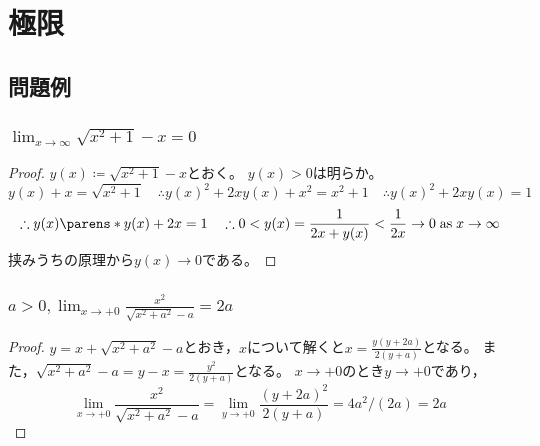 \chapter{極限}
    \section{問題例}
        \subsection{\texorpdfstring{$\lim_{x\to\infty} \sqrt{x^2+1} - x = 0$}{√(x\string^2+1)-x → 0 as x→∞}}
            \begin{proof}
                $y(x) \coloneq \sqrt{x^2+1} - x$とおく。
                $y(x) > 0$は明らか。
                \[ y(x)+x = \sqrt{x^2+1} \quad \therefore y(x)^2 + 2xy(x) + x^2 = x^2 + 1 \quad \therefore y(x)^2 + 2xy(x) = 1 \]
                \[ \therefore y(x)\parens*{y(x) + 2x} = 1 \quad \therefore 0 < y(x) = \frac{1}{2x + y(x)} < \frac{1}{2x} \to 0\;\text{as}\;x\to\infty \]
                挟みうちの原理から$y(x) \to 0$である。
            \end{proof}
        \subsection{\texorpdfstring{$a>0,\lim_{x\to+0}\frac{x^2}{\sqrt{x^2+a^2}-a} = 2a$}{x\string^2/(√(x\string^2+a\string^2)-a) → 2a as x → +0}}
            \begin{proof}
                $y = x + \sqrt{x^2+a^2} - a$とおき，$x$について解くと$x = \frac{y(y+2a)}{2(y+a)}$となる。
                また，$\sqrt{x^2+a^2}-a = y - x = \frac{y^2}{2(y+a)}$となる。
                $x\to+0$のとき$y\to+0$であり，
                \[ \lim_{x\to+0}\frac{x^2}{\sqrt{x^2+a^2}-a} = \lim_{y\to+0} \frac{(y+2a)^2}{2(y+a)} = 4a^2/(2a) = 2a \]
            \end{proof}